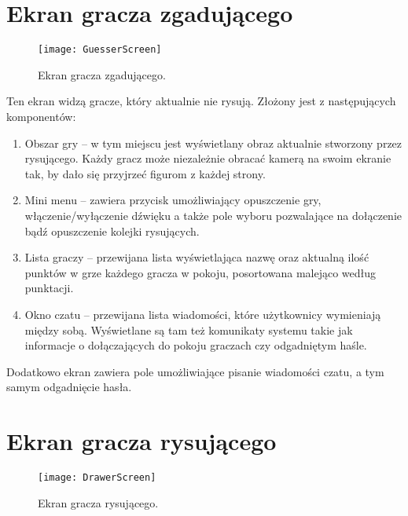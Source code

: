 \section{Ekran gracza zgadującego}
\begin{figure}[htbp]
\centering
\texttt{[image: GuesserScreen]}
\caption{Ekran gracza zgadującego.}
\label{fig:guesserscreen}
\end{figure}

Ten ekran widzą gracze, który aktualnie nie rysują. Złożony jest z następujących komponentów:
\begin{enumerate}
    \item Obszar gry – w tym miejscu jest wyświetlany obraz aktualnie stworzony przez rysującego. Każdy gracz może niezależnie obracać kamerą na swoim ekranie tak, by dało się przyjrzeć figurom z każdej strony. 
    \item Mini menu – zawiera przycisk umożliwiający opuszczenie gry, włączenie/wyłączenie dźwięku a także pole wyboru pozwalające na dołączenie bądź opuszczenie kolejki rysujących.
    \item Lista graczy – przewijana lista wyświetlająca nazwę oraz aktualną ilość punktów w grze każdego gracza w pokoju, posortowana malejąco według punktacji.
    \item Okno czatu – przewijana lista wiadomości, które użytkownicy wymieniają między sobą. Wyświetlane są tam też komunikaty systemu takie jak informacje o dołączających do pokoju graczach czy odgadniętym haśle. 
\end{enumerate}

Dodatkowo ekran zawiera pole umożliwiające pisanie wiadomości czatu, a tym samym odgadnięcie hasła.

\section{Ekran gracza rysującego}
\begin{figure}[htbp]
\centering
\texttt{[image: DrawerScreen]}
\caption{Ekran gracza rysującego.}
\label{fig:drawerscreen}
\end{figure}

